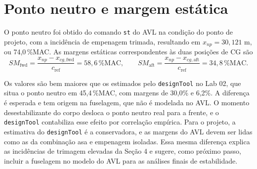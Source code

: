 \newpage
\section{Ponto neutro e margem estática}

O ponto neutro foi obtido do comando \texttt{st} do AVL na condição do
ponto de projeto, com a incidência de empenagem trimada, resultando em
$x_{np} = 30{,}121$ m, ou 74,0\,\%MAC. As margens estáticas
correspondentes às duas posições de CG são
\begin{equation*}
    SM_{\mathrm{fwd}} = \frac{x_{np} - x_{cg,\mathrm{fwd}}}{c_{\mathrm{ref}}}
    = 58{,}6\,\%\mathrm{MAC},
    \qquad
    SM_{\mathrm{aft}} = \frac{x_{np} - x_{cg,\mathrm{aft}}}{c_{\mathrm{ref}}}
    = 34{,}8\,\%\mathrm{MAC}.
\end{equation*}

Os valores são bem maiores que os estimados pelo \texttt{designTool} no
Lab 02, que situa o ponto neutro em 45,4\,\%MAC, com margens de 30,0\% e
6,2\%. A diferença é esperada e tem origem na fuselagem, que não é
modelada no AVL. O momento desestabilizante do corpo desloca o ponto
neutro real para a frente, e o \texttt{designTool} contabiliza esse efeito
por correlação empírica. Para o projeto, a estimativa do
\texttt{designTool} é a conservadora, e as margens do AVL devem ser lidas
como as da combinação asa e empenagem isoladas. Essa mesma diferença
explica as incidências de trimagem elevadas da Seção 4 e sugere, como
próximo passo, incluir a fuselagem no modelo do AVL para as análises
finais de estabilidade.
